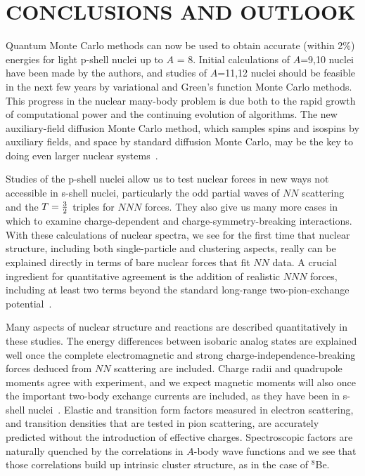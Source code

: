 \section{CONCLUSIONS AND OUTLOOK}

Quantum Monte Carlo methods can now be used to obtain accurate (within 2\%)
energies for light p-shell nuclei up to $A$ = 8.
Initial calculations of $A$=9,10 nuclei have been made by the authors, and 
studies of $A$=11,12 nuclei should be feasible in the next few years by
variational and Green's function Monte Carlo methods.
This progress in the nuclear many-body problem is due both to the rapid 
growth of computational power and the continuing evolution of algorithms.
The new auxiliary-field diffusion Monte Carlo method, which samples spins and
isospins by auxiliary fields, and space by standard diffusion Monte Carlo,
may be the key to doing even larger nuclear systems~\cite{SF99}.

Studies of the p-shell nuclei allow us to test nuclear forces in new ways
not accessible in s-shell nuclei, particularly the odd partial waves of
$N\!N$ scattering and the $T=\textstyle{3\over2}$ triples for $N\!N\!N$ forces.
They also give us many more cases in which to examine charge-dependent and 
charge-symmetry-breaking interactions.
With these calculations of nuclear spectra, we see for the first time that
nuclear structure, including both single-particle and clustering aspects,
really can be explained directly in terms of bare 
nuclear forces that fit $N\!N$ data.
A crucial ingredient for quantitative agreement is the addition of realistic 
$N\!N\!N$ forces, including at least two terms beyond the standard 
long-range two-pion-exchange potential~\cite{PPWC01}.

Many aspects of nuclear structure and reactions are described
quantitatively in these studies.
The energy differences between isobaric analog states are explained well once
the complete electromagnetic and strong charge-independence-breaking 
forces deduced from $N\!N$ scattering are included.
Charge radii and quadrupole moments agree with experiment, and we expect 
magnetic moments will also once the important two-body exchange currents 
are included, as they have been in s-shell nuclei~\cite{MRS98}.
Elastic and transition form factors measured in electron scattering,
and transition densities that are tested in pion scattering,
are accurately predicted without the introduction of effective charges.
Spectroscopic factors are naturally quenched by the correlations in
$A$-body wave functions and we see that those correlations build up
intrinsic cluster structure, as in the case of $^8$Be.

